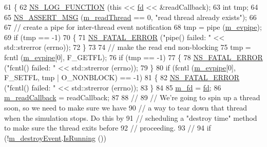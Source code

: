 \begin{DoxyCode}
61 \{
62   \hyperlink{log-macros-disabled_8h_a90b90d5bad1f39cb1b64923ea94c0761}{NS\_LOG\_FUNCTION} (\textcolor{keyword}{this} << \hyperlink{lte_2model_2fading-traces_2fading__trace__generator_8m_a44f21d5190b5a6df8089f54799628d7e}{fd} << &readCallback);
63   \textcolor{keywordtype}{int} tmp;
64 
65   \hyperlink{assert_8h_aff5ece9066c74e681e74999856f08539}{NS\_ASSERT\_MSG} (\hyperlink{classns3_1_1FdReader_ae610be5a8e8c8e72620fe131f3277cd6}{m\_readThread} == 0, \textcolor{stringliteral}{"read thread already exists"});
66 
67   \textcolor{comment}{// create a pipe for inter-thread event notification}
68   tmp = pipe (\hyperlink{classns3_1_1FdReader_a0c4a678111029fdc40948d4d7657aa41}{m\_evpipe});
69   \textcolor{keywordflow}{if} (tmp == -1)
70     \{
71       \hyperlink{group__fatal_ga5131d5e3f75d7d4cbfd706ac456fdc85}{NS\_FATAL\_ERROR} (\textcolor{stringliteral}{"pipe() failed: "} << std::strerror (errno));
72     \}
73 
74   \textcolor{comment}{// make the read end non-blocking}
75   tmp = fcntl (\hyperlink{classns3_1_1FdReader_a0c4a678111029fdc40948d4d7657aa41}{m\_evpipe}[0], F\_GETFL);
76   \textcolor{keywordflow}{if} (tmp == -1)
77     \{
78       \hyperlink{group__fatal_ga5131d5e3f75d7d4cbfd706ac456fdc85}{NS\_FATAL\_ERROR} (\textcolor{stringliteral}{"fcntl() failed: "} << std::strerror (errno));
79     \}
80   \textcolor{keywordflow}{if} (fcntl (\hyperlink{classns3_1_1FdReader_a0c4a678111029fdc40948d4d7657aa41}{m\_evpipe}[0], F\_SETFL, tmp | O\_NONBLOCK) == -1)
81     \{
82       \hyperlink{group__fatal_ga5131d5e3f75d7d4cbfd706ac456fdc85}{NS\_FATAL\_ERROR} (\textcolor{stringliteral}{"fcntl() failed: "} << std::strerror (errno));
83     \}
84 
85   \hyperlink{classns3_1_1FdReader_ad0883be1c0ebac30885c17c0cc17076d}{m\_fd} = \hyperlink{lte_2model_2fading-traces_2fading__trace__generator_8m_a44f21d5190b5a6df8089f54799628d7e}{fd};
86   \hyperlink{classns3_1_1FdReader_af5cd7136ecc802487df40cd8046d6fe1}{m\_readCallback} = readCallback;
87 
88   \textcolor{comment}{//}
89   \textcolor{comment}{// We're going to spin up a thread soon, so we need to make sure we have}
90   \textcolor{comment}{// a way to tear down that thread when the simulation stops.  Do this by}
91   \textcolor{comment}{// scheduling a "destroy time" method to make sure the thread exits before}
92   \textcolor{comment}{// proceeding.}
93   \textcolor{comment}{//}
94   \textcolor{keywordflow}{if} (!\hyperlink{classns3_1_1FdReader_a9f3cee67eb1d43aa53ebc23384e32828}{m\_destroyEvent}.\hyperlink{classns3_1_1EventId_aabf8476d1a080c199ea0c6aa9ccea372}{IsRunning} ())

\end{DoxyCode}
